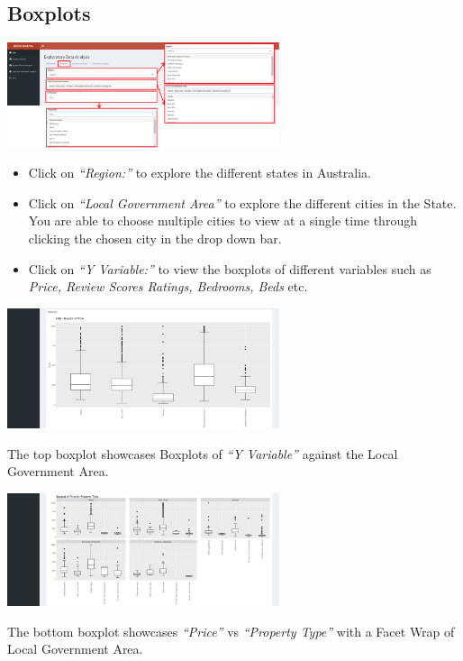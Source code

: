 \documentclass[
]{article}
\providecommand{\tightlist}{%
  \setlength{\itemsep}{0pt}\setlength{\parskip}{0pt}}
\begin{document}
\hypertarget{boxplots}{%
\subsection{Boxplots}\label{boxplots}}

\includegraphics[width=0.6\textwidth,height=\textheight]{images/edabox.png}

\begin{itemize}
\tightlist
\item
  Click on \emph{``Region:''} to explore the different states in
  Australia.
\item
  Click on \emph{``Local Government Area''} to explore the different
  cities in the State. You are able to choose multiple cities to view at
  a single time through clicking the chosen city in the drop down bar.
\item
  Click on \emph{``Y Variable:''} to view the boxplots of different
  variables such as \emph{Price, Review Scores Ratings, Bedrooms, Beds}
  etc.
\end{itemize}

\includegraphics[width=0.6\textwidth,height=\textheight]{images/edabox2.png}

The top boxplot showcases Boxplots of \emph{``Y Variable''} against the
Local Government Area.

\includegraphics[width=0.6\textwidth,height=\textheight]{images/edabox3.png}

The bottom boxplot showcases \emph{``Price''} vs \emph{``Property
Type''} with a Facet Wrap of Local Government Area.
\end{document}
